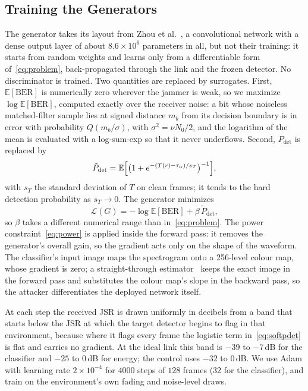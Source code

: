 \subsection{Training the Generators}\label{sec:method:training}
The generator takes its layout from Zhou et al.~\cite{11184988}, a convolutional network with a dense output layer of about $8.6\times10^6$ parameters in all, but not their training: it starts from random weights and learns only from a differentiable form of~\eqref{eq:problem}, back-propagated through the link and the frozen detector.
No discriminator is trained.
Two quantities are replaced by surrogates.
First, $\mathbb{E}[\mathrm{BER}]$ is numerically zero wherever the jammer is weak, so we maximize $\log\mathbb{E}[\mathrm{BER}]$, computed exactly over the receiver noise: a bit whose noiseless matched-filter sample lies at signed distance $m_b$ from its decision boundary is in error with probability $Q(m_b/\sigma)$, with $\sigma^2=\nu N_0/2$, and the logarithm of the mean is evaluated with a log-sum-exp so that it never underflows.
Second, $P_{\mathrm{det}}$ is replaced by
\begin{equation}
\tilde P_{\mathrm{det}}=\mathbb{E}\Bigl[\bigl(1+e^{-(T(r)-\tau_\alpha)/s_T}\bigr)^{-1}\Bigr],
\label{eq:softpdet}
\end{equation}
with $s_T$ the standard deviation of $T$ on clean frames; it tends to the hard detection probability as $s_T\to0$.
The generator minimizes
\begin{equation}
\mathcal{L}(G)=-\log\mathbb{E}[\mathrm{BER}]+\beta\,\tilde P_{\mathrm{det}},
\label{eq:loss}
\end{equation}
so $\beta$ takes a different numerical range than in~\eqref{eq:problem}.
The power constraint~\eqref{eq:power} is applied inside the forward pass: it removes the generator's overall gain, so the gradient acts only on the shape of the waveform.
The classifier's input image maps the spectrogram onto a 256-level colour map, whose gradient is zero; a straight-through estimator~\cite{bengio2013estimating} keeps the exact image in the forward pass and substitutes the colour map's slope in the backward pass, so the attacker differentiates the deployed network itself.

At each step the received JSR is drawn uniformly in decibels from a band that starts below the JSR at which the target detector begins to flag in that environment, because where it flags every frame the logistic term in~\eqref{eq:softpdet} is flat and carries no gradient.
At the ideal link this band is $-39$ to $-7$\,dB for the classifier and $-25$ to $0$\,dB for energy; the control uses $-32$ to $0$\,dB.
We use Adam with learning rate $2\times10^{-4}$ for $4000$ steps of $128$ frames ($32$ for the classifier), and train on the environment's own fading and noise-level draws.

